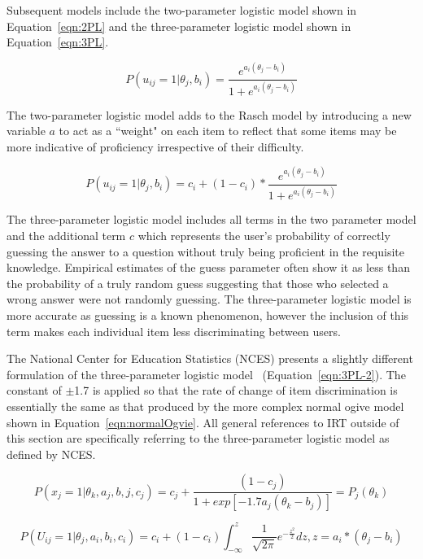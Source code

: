 \documentclass[letterpaper, 12pt, captions=tableabove]{scrreprt}
\begin{document}
			Subsequent models include the two-parameter logistic model shown in Equation~\ref{eqn:2PL} and the three-parameter logistic model shown in Equation~\ref{eqn:3PL}. 

			\begin{equation}
				\label{eqn:2PL}
				P(u_{ij} = 1 | \theta_j, b_i) = \frac{e^{a_i(\theta_j-b_i)}}{1+e^{a_i(\theta_j-b_i)}} 			
			\end{equation}

			The two-parameter logistic model adds to the Rasch model by introducing a new variable $a$ to act as a ``weight" on each item to reflect that some items may be more indicative of proficiency irrespective of their difficulty. 

			\begin{equation}
				\label{eqn:3PL}
				P(u_{ij} = 1 | \theta_j, b_i) = c_i + (1-c_i)*\frac{e^{a_i(\theta_j-b_i)}}{1+e^{a_i(\theta_j-b_i)}} 		
			\end{equation}

			The three-parameter logistic model includes all terms in the two parameter model and the additional term $c$ which represents the user's probability of correctly guessing the answer to a question without truly being proficient in the requisite knowledge. Empirical estimates of the guess parameter often show it as less than the probability of a truly random guess suggesting that those who selected a wrong answer were not randomly guessing. The three-parameter logistic model is more accurate as guessing is a known phenomenon, however the inclusion of this term makes each individual item less discriminating between users.

			The National Center for Education Statistics (NCES) presents a slightly different formulation of the three-parameter logistic model~\cite{nces_3pl} (Equation~\ref{eqn:3PL-2}). The constant of $\pm$1.7 is applied so that the rate of change of item discrimination is essentially the same as that produced by the more complex normal ogive model shown in Equation~\ref{eqn:normalOgvie}. All general references to IRT outside of this section are specifically referring to the three-parameter logistic model as defined by NCES.

			\begin{equation}
				\label{eqn:3PL-2}
				P(x_j=1|\theta_k, a_j, b, j, c_j) = c_j + \frac{(1-c_j)}{1+ exp[-1.7a_j(\theta_k-b_j)]} = P_j(\theta_k)
			\end{equation}
		
			\begin{equation}
				\label{eqn:normalOgvie}
				P(U_{ij} = 1 | \theta_j, a_i, b_i, c_i) = c_i + (1-c_i)\int^z_{-\infty}\frac{1}{\sqrt{2\pi}}e^{-\frac{z^2}{2}}dz, z = a_i*(\theta_j - b_i)
			\end{equation}
\end{document}
